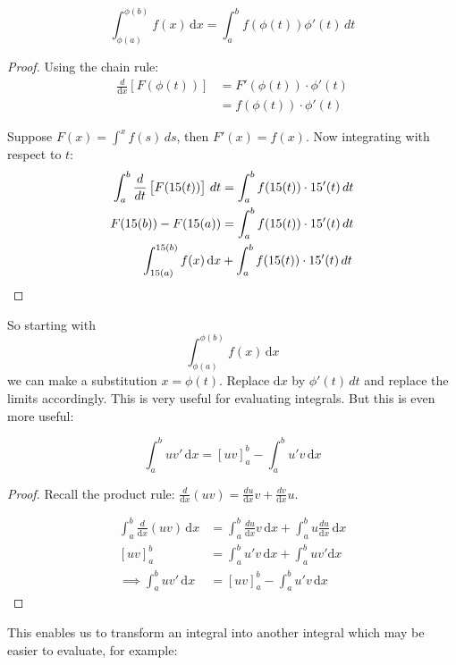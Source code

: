 \documentclass[10pt]{scrartcl}
\begin{document}
\begin{theorem}
 \[\int_{\phi(a)}^{\phi(b)} f(x)\,\mathrm{d}x = \int_a^b f(\phi(t))\phi'(t)\,dt\]
\end{theorem}
\begin{proof}
Using the chain rule: 
\[
\begin{aligned}
  \frac{d}{\mathrm{d}x}\left[F(\phi(t))\right] &= F'(\phi(t))\cdot\phi'(t)\\
  &= f(\phi(t))\cdot\phi'(t)
\end{aligned}
\]

Suppose $F(x) = \int^x f(s)\,ds$, then $F'(x) = f(x)$. Now integrating with respect to $t$: 
\begin{align*}
  \int_a^b \frac{d}{dt}\left[F(\phi(t))\right]\,dt &= \int_a^b f(\phi(t))\cdot\phi'(t)\,dt\\
  F(\phi(b)) - F(\phi(a)) &= \int_a^b f(\phi(t))\cdot\phi'(t)\,dt\\
  \int_{\phi(a)}^{\phi(b)} f(x)\,\mathrm{d}x &+ \int_a^b f(\phi(t))\cdot\phi'(t)\,dt\qedhere
\end{align*}
\end{proof}

So starting with 
\[ \int_{\phi(a)}^{\phi(b)} f(x)\,\mathrm{d}x\]
we can make a substitution $x = \phi(t)$. Replace $\mathrm{d}x$ by $\phi'(t)\,dt$ and replace the limits accordingly. This is very useful for evaluating integrals. But this is even more useful:\\

\begin{theorem}
\[\int_a^b uv'\,\mathrm{d}x = [uv]_a^b - \int_a^bu'v\,\mathrm{d}x\]
\end{theorem}
\begin{proof}
	Recall the product rule: $\frac{d}{\mathrm{d}x}(uv) = \frac{du}{\mathrm{d}x}v + \frac{dv}{\mathrm{d}x}u$. 
	
	\[
\begin{aligned}
  \int_a^b \frac{d}{\mathrm{d}x}(uv)\,\mathrm{d}x &= \int_a^b \frac{du}{\mathrm{d}x}v\,\mathrm{d}x + \int_a^b u\frac{du}{\mathrm{d}x}\,\mathrm{d}x\\
  [uv]_a^b &= \int_a^b u'v\,\mathrm{d}x + \int_a^b uv'\mathrm{d}x\\
 \implies \int_a^b uv'\,\mathrm{d}x &= [uv]_a^b - \int_a^b u'v\,\mathrm{d}x
\end{aligned}
\]
\end{proof}

This enables us to transform an integral into another integral which may be easier to evaluate, for example:\\
\end{document}
